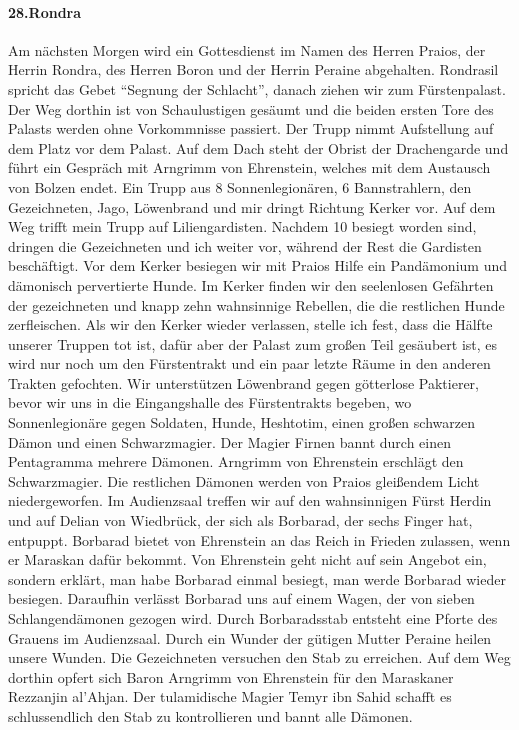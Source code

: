 \paragraph{28.Rondra}
Am nächsten Morgen wird ein Gottesdienst im Namen des Herren Praios, der Herrin Rondra, des Herren Boron und der Herrin Peraine abgehalten. Rondrasil spricht das Gebet ``Segnung der Schlacht'', danach ziehen wir zum Fürstenpalast. Der Weg dorthin ist von Schaulustigen gesäumt und die beiden ersten Tore des Palasts werden ohne Vorkommnisse passiert. Der Trupp nimmt Aufstellung auf dem Platz vor dem Palast. Auf dem Dach steht der Obrist der Drachengarde und führt ein Gespräch mit Arngrimm von Ehrenstein, welches mit dem Austausch von Bolzen endet. Ein Trupp aus 8 Sonnenlegionären, 6 Bannstrahlern, den Gezeichneten, Jago, Löwenbrand und mir dringt Richtung Kerker vor. Auf dem Weg trifft mein Trupp auf Liliengardisten. Nachdem 10 besiegt worden sind, dringen die Gezeichneten und ich weiter vor, während der Rest die Gardisten beschäftigt. Vor dem Kerker besiegen wir mit Praios Hilfe ein Pandämonium und dämonisch pervertierte Hunde. Im Kerker finden wir den seelenlosen Gefährten der gezeichneten und knapp zehn wahnsinnige Rebellen, die die restlichen Hunde zerfleischen. Als wir den Kerker wieder verlassen, stelle ich fest, dass die Hälfte unserer Truppen tot ist, dafür aber der Palast zum großen Teil gesäubert ist, es wird nur noch um den Fürstentrakt und ein paar letzte Räume in den anderen Trakten gefochten. Wir unterstützen Löwenbrand gegen götterlose Paktierer, bevor wir uns in die Eingangshalle des Fürstentrakts begeben, wo Sonnenlegionäre gegen Soldaten, Hunde, Heshtotim, einen großen schwarzen Dämon und einen Schwarzmagier. Der Magier Firnen bannt durch einen Pentagramma mehrere Dämonen. Arngrimm von Ehrenstein erschlägt den Schwarzmagier. Die restlichen Dämonen werden von Praios gleißendem Licht niedergeworfen. Im Audienzsaal treffen wir auf den wahnsinnigen Fürst Herdin und auf Delian von Wiedbrück, der sich als Borbarad, der sechs Finger hat, entpuppt. Borbarad bietet von Ehrenstein an das Reich in Frieden zulassen, wenn er Maraskan dafür bekommt. Von Ehrenstein geht nicht auf sein Angebot ein, sondern erklärt, man habe Borbarad einmal besiegt, man werde Borbarad wieder besiegen. Daraufhin verlässt Borbarad uns auf einem Wagen, der von sieben Schlangendämonen gezogen wird. Durch Borbaradsstab entsteht eine Pforte des Grauens im Audienzsaal. Durch ein Wunder der gütigen Mutter Peraine heilen unsere Wunden. Die Gezeichneten versuchen den Stab zu erreichen. Auf dem Weg dorthin opfert sich Baron Arngrimm von Ehrenstein für den Maraskaner Rezzanjin al'Ahjan. Der tulamidische Magier Temyr ibn Sahid schafft es schlussendlich den Stab zu kontrollieren und bannt alle Dämonen.

